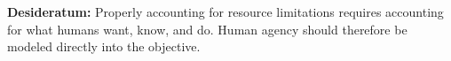 {\bbox
\textbf{Desideratum:}
Properly accounting for resource limitations requires
accounting for what humans want, know, and do.
Human agency should therefore be modeled directly into the objective.
\ebox




 



}
